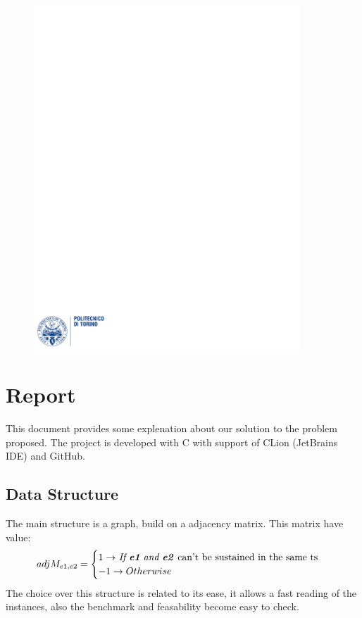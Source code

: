 \documentclass[12pt]{article}
\begin{document}
\begin{figure}
  \centering
  \includegraphics[width=10cm]{images/polito.pdf}
\end{figure}

\maketitle %
\newpage

\section{Report}
This document provides some explenation about our solution to the problem proposed. The project is developed with C with support of CLion (JetBrains IDE) and GitHub.

\subsection{Data Structure}
The main structure is a graph, build on a adjacency matrix. This matrix have value:
\begin{equation}
  \begin{gathered}
    adjM_{e1,e2} = \begin{cases} 1 \rightarrow $ \textit{If \textbf{e1} and \textbf{e2}} can't be sustained in the same ts$ \\ -1 \rightarrow Otherwise \end{cases}
  \end{gathered}
\end{equation}
The choice over this structure is related to its ease, it allows a fast reading of the instances, also the benchmark and feasability become easy to check.
\end{document}
